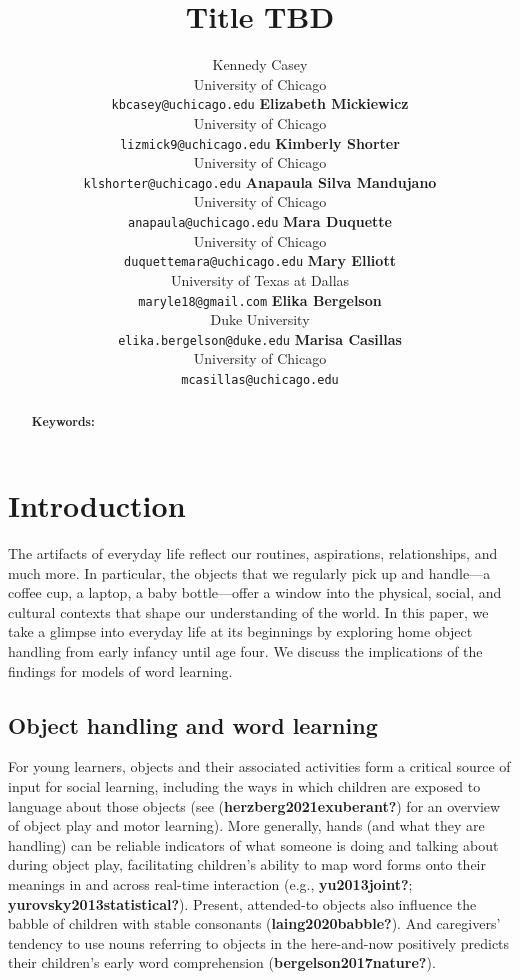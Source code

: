 \documentclass[10pt, letterpaper]{article}
\title{Title TBD}
\author{Kennedy Casey \\
        University of Chicago \\
        \texttt{kbcasey@uchicago.edu}
\And \textbf{Elizabeth Mickiewicz} \\
             University of Chicago \\
             \texttt{lizmick9@uchicago.edu}
\And \textbf{Kimberly Shorter} \\
             University of Chicago \\
             \texttt{klshorter@uchicago.edu}
\And \textbf{Anapaula Silva Mandujano} \\
             University of Chicago \\
             \texttt{anapaula@uchicago.edu}            
\AND \textbf{Mara Duquette} \\
             University of Chicago \\
             \texttt{duquettemara@uchicago.edu}
\And \textbf{Mary Elliott} \\
             University of Texas at Dallas \\
             \texttt{maryle18@gmail.com}
\And \textbf{Elika Bergelson} \\
             Duke University \\
             \texttt{elika.bergelson@duke.edu}
\And \textbf{Marisa Casillas} \\
             University of Chicago \\
             \texttt{mcasillas@uchicago.edu}}
\begin{document}
\maketitle

\begin{abstract}


\textbf{Keywords:}

\end{abstract}

\hypertarget{introduction}{%
\section{Introduction}\label{introduction}}

The artifacts of everyday life reflect our routines, aspirations,
relationships, and much more. In particular, the objects that we
regularly pick up and handle---a coffee cup, a laptop, a baby
bottle---offer a window into the physical, social, and cultural contexts
that shape our understanding of the world. In this paper, we take a
glimpse into everyday life at its beginnings by exploring home object
handling from early infancy until age four. We discuss the implications
of the findings for models of word learning.

\hypertarget{object-handling-and-word-learning}{%
\subsection{Object handling and word
learning}\label{object-handling-and-word-learning}}

For young learners, objects and their associated activities form a
critical source of input for social learning, including the ways in
which children are exposed to language about those objects (see
(\textbf{herzberg2021exuberant?}) for an overview of object play and
motor learning). More generally, hands (and what they are handling) can
be reliable indicators of what someone is doing and talking about during
object play, facilitating children's ability to map word forms onto
their meanings in and across real-time interaction (e.g.,
\textbf{yu2013joint?}; \textbf{yurovsky2013statistical?}). Present,
attended-to objects also influence the babble of children with stable
consonants (\textbf{laing2020babble?}). And caregivers' tendency to use
nouns referring to objects in the here-and-now positively predicts their
children's early word comprehension (\textbf{bergelson2017nature?}).
\end{document}
